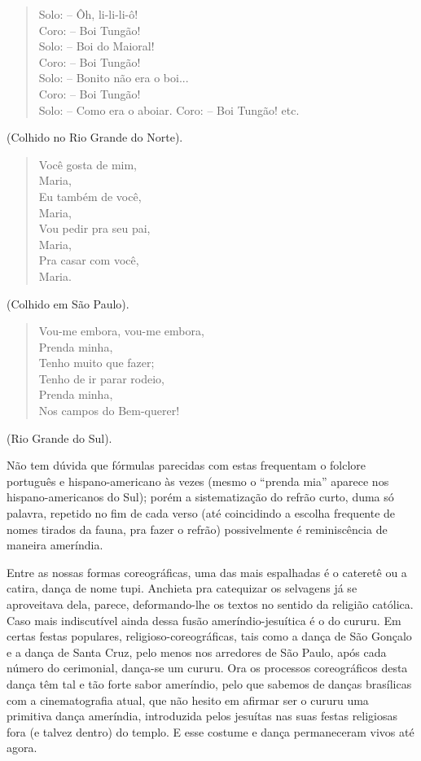 \begin{verse}
Solo: -- Ôh, li-li-li-ô!\\
Coro: -- Boi Tungão!\\
Solo: -- Boi do Maioral!\\
Coro: -- Boi Tungão!\\
Solo: -- Bonito não era o boi...\\
Coro: -- Boi Tungão!\\
Solo: -- Como era o aboiar. Coro: -- Boi Tungão! etc.
\end{verse}

(Colhido no Rio Grande do Norte).

\begin{verse}
Você gosta de mim,\\
Maria,\\
Eu também de você,\\
Maria,\\
Vou pedir pra seu pai,\\
Maria,\\
Pra casar com você,\\
Maria.
\end{verse}

(Colhido em São Paulo).

\begin{verse}
Vou-me embora, vou-me embora,\\
Prenda minha,\\
Tenho muito que fazer;\\
Tenho de ir parar rodeio,\\
Prenda minha,\\
Nos campos do Bem-querer!
\end{verse}

(Rio Grande do Sul).

Não tem dúvida que fórmulas parecidas com estas frequentam o folclore
português e hispano-americano às vezes (mesmo o ``prenda mia'' aparece
nos hispano-americanos do Sul); porém a sistematização do refrão curto,
duma só palavra, repetido no fim de cada verso (até coincidindo a
escolha frequente de nomes tirados da fauna, pra fazer o refrão)
possivelmente é reminiscência de maneira ameríndia.

Entre as nossas formas coreográficas, uma das mais espalhadas é o
cateretê ou a catira, dança de nome tupi. Anchieta pra catequizar os
selvagens já se aproveitava dela, parece, deformando-lhe os textos no
sentido da religião católica. Caso mais indiscutível ainda dessa fusão
ameríndio-jesuítica é o do cururu. Em certas festas populares,
religioso-coreográficas, tais como a dança de São Gonçalo e a dança de
Santa Cruz, pelo menos nos arredores de São Paulo, após cada número do
cerimonial, dança-se um cururu. Ora os processos coreográficos desta
dança têm tal e tão forte sabor ameríndio, pelo que sabemos de danças
brasílicas com a cinematografia atual, que não hesito em afirmar ser o
cururu uma primitiva dança ameríndia, introduzida pelos jesuítas nas
suas festas religiosas fora (e talvez dentro) do templo. E esse costume
e dança permaneceram vivos até agora.


